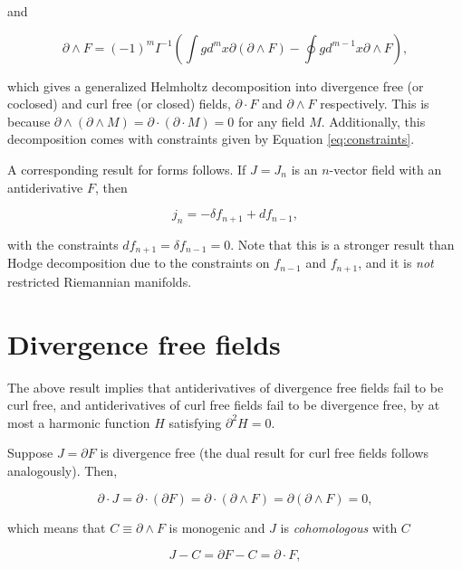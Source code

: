 \documentclass{article}
\begin{document}
and

\begin{equation}
  \partial \wedge F = (-1)^m I^{-1} \left(\int g d^{m}x \partial (\partial \wedge F) - \oint g d^{m-1}x \partial \wedge F\right),
\end{equation}

which gives a generalized Helmholtz decomposition into divergence free (or coclosed) and curl free (or closed) fields, $\partial \cdot F$ and $\partial \wedge F$ respectively. This is because $\partial \wedge (\partial \wedge M) = \partial \cdot (\partial \cdot M) = 0$ for any field $M$. Additionally, this decomposition comes with constraints given by Equation \ref{eq:constraints}.

A corresponding result for forms follows. If $J = J_n$ is an $n$-vector field with an antiderivative $F$, then

\begin{equation}
  j_n = -\delta f_{n+1} + d f_{n-1},
\end{equation}

with the constraints $df_{n+1}=\delta f_{n-1} = 0$. Note that this is a stronger result than Hodge decomposition due to the constraints on $f_{n-1}$ and $f_{n+1}$, and it is \emph{not} restricted Riemannian manifolds.

\section{Divergence free fields}The above result implies that antiderivatives of divergence free fields fail to be curl free, and antiderivatives of curl free fields fail to be divergence free, by at most a harmonic function $H$ satisfying $\partial^2 H = 0$.

Suppose $J = \partial F$ is divergence free (the dual result for curl free fields follows analogously). Then, 

\begin{equation}
  \partial \cdot J = \partial \cdot (\partial F) = \partial \cdot (\partial \wedge F) = \partial (\partial \wedge F) = 0,
\end{equation}

which means that $C \equiv \partial \wedge F$ is monogenic and $J$ is \emph{cohomologous} with $C$

\begin{equation}
  J - C = \partial F - C = \partial \cdot F,\label{eq:cohomologous}
\end{equation}
\end{document}
